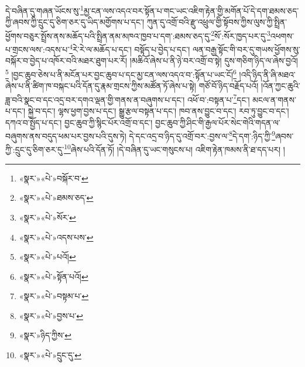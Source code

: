 དེ་བཞིན་དུ་གཞན་ཡོངས་སུ་\footnote{«སྣར་»«པེ་»བསྐོར་བ་}མྱ་ངན་ལས་འདའ་བར་སྟོན་པ་གང་ཡང་འཇིག་རྟེན་གྱི་མགོན་པོ་དེ་དག་ཐམས་ཅད་ཀྱི་ཞབས་ཀྱི་དྲུང་དུ་ཅིག་ཅར་དུ་ཡིད་མགྱོགས་པ་དང་། ཀུན་དུ་འགྲོ་བའི་རྫུ་འཕྲུལ་གྱི་སྟོབས་ཀྱིས་ལུས་ཀྱི་སྤྲིན་ཕྱོགས་བཅུར་སྤྲོས་ནས་མཆོད་པའི་སྤྲིན་ནམ་མཁའ་ཁྱབ་པ་དག་:ཐམས་ཅད་དུ་\footnote{«སྣར་»«པེ་»ཐམས་ཅད་}སོ་:སོར་ཁྱད་པར་དུ་\footnote{«སྣར་»«པེ་»སོར་}འཕགས་པ་གྲངས་ལས་:འདས་པ་\footnote{«སྣར་»«པེ་»འདས་པས་}རེ་རེ་ལ་མཆོད་པ་དང་། བསྟོད་པ་བྱེད་པ་དང་། ལན་བརྒྱ་སྟོང་གི་བར་དུ་གཡས་ཕྱོགས་སུ་བསྐོར་བ་བྱེད་པ་འཁོར་བའི་མཐར་ཐུག་པར་རོ། །མཆིའོ་ཞེས་པ་ནི་ཉེ་བར་འགྲོ་བ་སྟེ། དུས་གཅིག་ཉིད་ལ་ཞེས་བྱའོ།\footnote{«སྣར་»«པེ་»པའོ།} །བྱང་ཆུབ་ཅེས་པ་ནི་མངོན་པར་བྱང་ཆུབ་པ་དང་མྱ་ངན་ལས་འདའ་བ་:སྟོན་པ་ཡང་ངོ།\footnote{«སྣར་»«པེ་»སྟོན་པའོ།} །འདི་ཉིད་ནི་ཞི་མཐའ་ཞེས་པ་ནི་ཚིག་ཁ་བསྐང་པའི་དོན་དུ་རྣམ་གྲངས་ཀྱིས་མཚོན་ཏོ་ཞེས་པ་སྟེ། གཙོ་བོ་ཉིད་བརྗོད་པའོ། །འོན་ཀྱང་ཆུའི་ཟླ་བའི་སྣང་བ་དང་འདྲ་བར་དགའ་ལྡན་གྱི་གནས་ན་བཞུགས་པ་དང་། འཕོ་བ་:བསྟན་པ་\footnote{«སྣར་»«པེ་»བསྟམ་པ་}དང་། མངལ་ན་གནས་པ་དང་། སྐྱེ་བ་དང་། ལྷས་ཕྱག་བྱས་པ་དང་། སྒྱུ་རྩལ་བསྟན་པ་དང་། ཁབ་ནས་བྱུང་བ་དང་། རབ་ཏུ་བྱུང་བ་དང་། དཀའ་བ་སྤྱོད་པ་དང་། བྱང་ཆུབ་ཀྱི་སྙིང་པོར་འགྲོ་བ་དང་། བྱང་ཆུབ་ཀྱི་ཤིང་གི་རྒྱལ་པོར་སེང་གེའི་གདན་ལ་བཞུགས་ནས་བདུད་ཕམ་པར་བྱས་པའི་དུས་ཏེ། དེ་དང་འདྲ་བ་ཉིད་དུ་འགྲོ་བར་:བྱས་ལ་\footnote{«སྣར་»«པེ་»བྱས་པ་}དེ་དག་:ཉིད་ཀྱི་\footnote{«སྣར་»ཉིད་ཀྱིས་}ཞབས་ཀྱི་:དྲུང་དུ་ཅིག་ཅར་དུ་\footnote{«སྣར་»«པེ་»དྲུང་དུ་}ཞེས་པའི་དོན་ཏོ། །དེ་བཞིན་དུ་ཡང་གསུངས་པ། འཇིག་རྟེན་ཁམས་ནི་ཐ་དད་པར། །
